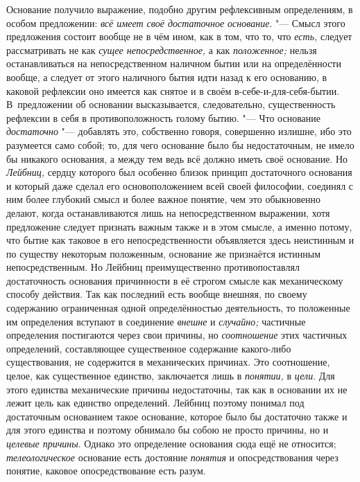 Основание получило выражение, подобно другим рефлексивным определениям, в
особом предложении: {\em всё имеет своё достаточное
основание}. "--- Смысл этого предложения состоит вообще не в чём ином, как в
том, что то, что {\em есть,} следует рассматривать не
как {\em сущее непосредственное,} а как
{\em положенное;} нельзя останавливаться на
непосредственном наличном бытии или на определённости вообще, а следует от
этого наличного бытия идти назад к его основанию, в каковой рефлексии оно
имеется как снятое и в своём в-себе-и-для-себя-бытии. В~предложении об
основании высказывается, следовательно, существенность рефлексии в себя в
противоположность голому бытию. "--- Что основание
{\em достаточно} "--- добавлять это, собственно говоря,
совершенно излишне, ибо это разумеется само собой; то, для чего основание
было бы недостаточным, не имело бы никакого основания, а между тем ведь всё
должно иметь своё основание. Но {\em Лейбниц,} сердцу
которого был особенно близок принцип достаточного основания и который даже
сделал его основоположением всей своей философии, соединял с ним более
глубокий смысл и более важное понятие, чем это обыкновенно делают, когда
останавливаются лишь на непосредственном выражении, хотя предложение
следует признать важным также и в этом смысле, а именно потому, что бытие
как таковое в его непосредственности объявляется здесь неистинным и по
существу некоторым положенным, основание же признаётся истинным
непосредственным. Но Лейбниц преимущественно противопоставлял достаточность
основания причинности в её строгом смысле как механическому способу
действия. Так как последний есть вообще внешняя, по своему содержанию
ограниченная одной определённостью деятельность, то положенные им
определения вступают в соединение {\em внешне} и
{\em случайно;} частичные определения постигаются через
свои причины, но {\em соотношение} этих частичных
определений, составляющее существенное содержание какого-либо
существования, не содержится в механических причинах. Это соотношение,
целое, как существенное единство, заключается лишь в
{\em понятии,} в {\em цели}. Для
этого единства механические причины недостаточны, так как в основании их не
лежит цель как единство определений. Лейбниц поэтому понимал под
достаточным основанием такое основание, которое было бы достаточно также и
для этого единства и поэтому обнимало бы собою не просто причины, но и
{\em целевые причины}. Однако это определение основания
сюда ещё не относится; {\em телеологическое} основание
есть достояние {\em понятия} и опосредствования через
понятие, каковое опосредствование есть разум.


